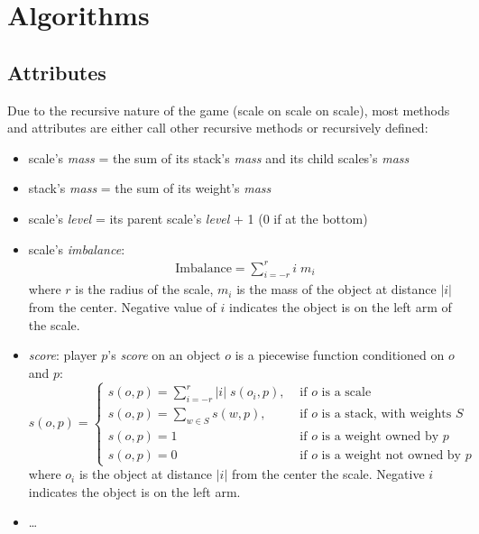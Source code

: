 \documentclass[12pt]{article}
\begin{document}
\section{Algorithms}
\subsection{Attributes}
Due to the recursive nature of the game (scale on scale on scale), most methods
and attributes are either call other recursive methods or recursively defined:
\begin{itemize}
  \item scale's \textit{mass} = the sum of its stack's \textit{mass} and its
    child scales's \textit{mass} 

  \item stack's \textit{mass} = the sum of its weight's \textit{mass}

  \item scale's \textit{level} = its parent scale's \textit{level}  + 1 (0 if at
    the bottom)

  \item scale's \textit{imbalance}: 
    \begin{align*}
      \text{Imbalance} = \sum_{i=-r}^{r}i\;m_i
    \end{align*}
    where $r$ is the radius of the scale, $m_i$ is the mass of the object at
    distance $|i|$ from the center. Negative value of $i$ indicates the object
    is on the left arm of the scale.

  \item \textit{score}: player $p$'s \textit{score} on an object $o$ is a
    piecewise function conditioned on $o$ and $p$:
    \begin{equation*}
      s(o,p) = \begin{cases}
        s(o, p) = \sum_{i=-r}^{r} |i|\;s(o_i, p) , &\text{ if $o$ is a scale}\\
        s(o, p) = \sum_{w\in S} s(w, p) , &\text{ if $o$ is a stack, with
        weights $S$}\\
        s(o, p) = 1 &\text{ if $o$ is a weight owned by $p$}\\
        s(o, p) = 0 &\text{ if $o$ is a weight not owned by $p$}
      \end{cases}
    \end{equation*}
    where $o_i$ is the object at distance $|i|$ from the center the scale.
    Negative $i$ indicates the object is on the left arm.

  \item \dots
\end{itemize}
\end{document}
